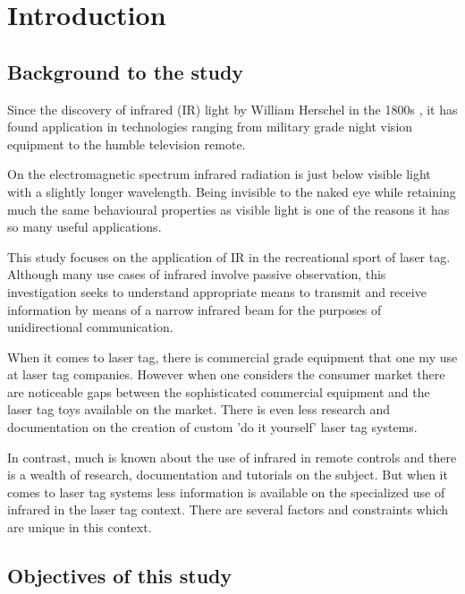 \chapter{Introduction}

\section{Background to the study}
Since the discovery of infrared (IR) light by William Herschel in the 1800s \cite{Rowan-Robinson2013}, it has found application in technologies ranging from military grade night vision equipment to the humble television remote.

On the electromagnetic spectrum infrared radiation is just below visible light with a slightly longer wavelength. Being invisible to the naked eye while retaining much the same behavioural properties as visible light is one of the reasons it has so many useful applications.

This study focuses on the application of IR in the recreational sport of laser tag. Although many use cases of infrared involve passive observation, this investigation seeks to understand appropriate means to transmit and receive information by means of a narrow infrared beam for the purposes of unidirectional communication.

When it comes to laser tag, there is commercial grade equipment that one my use at laser tag companies. However when one considers the consumer market there are noticeable gaps between the sophisticated commercial equipment and the laser tag toys available on the market. There is even less research and documentation on the creation of custom 'do it yourself' laser tag systems. 

In contrast, much is known about the use of infrared in remote controls and there is a wealth of research, documentation and tutorials on the subject. But when it comes to laser tag systems less information is available on the specialized use of infrared in the laser tag context. There are several factors and constraints which are unique in this context.



\section{Objectives of this study}
